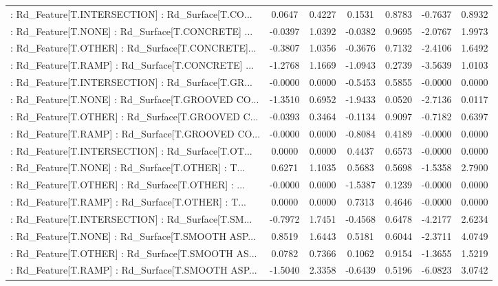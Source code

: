 \begin{longtable}{p{4cm}cccccc}
 : Rd\_Feature[T.INTERSECTION] : Rd\_Surface[T.CO... &  0.0647 &    0.4227 &  0.1531 &       0.8783 & -0.7637 &  0.8932 \\
 : Rd\_Feature[T.NONE] : Rd\_Surface[T.CONCRETE] ... & -0.0397 &    1.0392 & -0.0382 &       0.9695 & -2.0767 &  1.9973 \\
 : Rd\_Feature[T.OTHER] : Rd\_Surface[T.CONCRETE]... & -0.3807 &    1.0356 & -0.3676 &       0.7132 & -2.4106 &  1.6492 \\
 : Rd\_Feature[T.RAMP] : Rd\_Surface[T.CONCRETE] ... & -1.2768 &    1.1669 & -1.0943 &       0.2739 & -3.5639 &  1.0103 \\
 : Rd\_Feature[T.INTERSECTION] : Rd\_Surface[T.GR... & -0.0000 &    0.0000 & -0.5453 &       0.5855 & -0.0000 &  0.0000 \\
 : Rd\_Feature[T.NONE] : Rd\_Surface[T.GROOVED CO... & -1.3510 &    0.6952 & -1.9433 &       0.0520 & -2.7136 &  0.0117 \\
 : Rd\_Feature[T.OTHER] : Rd\_Surface[T.GROOVED C... & -0.0393 &    0.3464 & -0.1134 &       0.9097 & -0.7182 &  0.6397 \\
 : Rd\_Feature[T.RAMP] : Rd\_Surface[T.GROOVED CO... & -0.0000 &    0.0000 & -0.8084 &       0.4189 & -0.0000 &  0.0000 \\
 : Rd\_Feature[T.INTERSECTION] : Rd\_Surface[T.OT... &  0.0000 &    0.0000 &  0.4437 &       0.6573 & -0.0000 &  0.0000 \\
 : Rd\_Feature[T.NONE] : Rd\_Surface[T.OTHER] : T... &  0.6271 &    1.1035 &  0.5683 &       0.5698 & -1.5358 &  2.7900 \\
 : Rd\_Feature[T.OTHER] : Rd\_Surface[T.OTHER] : ... & -0.0000 &    0.0000 & -1.5387 &       0.1239 & -0.0000 &  0.0000 \\
 : Rd\_Feature[T.RAMP] : Rd\_Surface[T.OTHER] : T... &  0.0000 &    0.0000 &  0.7313 &       0.4646 & -0.0000 &  0.0000 \\
 : Rd\_Feature[T.INTERSECTION] : Rd\_Surface[T.SM... & -0.7972 &    1.7451 & -0.4568 &       0.6478 & -4.2177 &  2.6234 \\
 : Rd\_Feature[T.NONE] : Rd\_Surface[T.SMOOTH ASP... &  0.8519 &    1.6443 &  0.5181 &       0.6044 & -2.3711 &  4.0749 \\
 : Rd\_Feature[T.OTHER] : Rd\_Surface[T.SMOOTH AS... &  0.0782 &    0.7366 &  0.1062 &       0.9154 & -1.3655 &  1.5219 \\
 : Rd\_Feature[T.RAMP] : Rd\_Surface[T.SMOOTH ASP... & -1.5040 &    2.3358 & -0.6439 &       0.5196 & -6.0823 &  3.0742 \\

\end{longtable}
